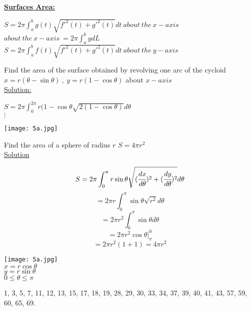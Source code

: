 \noindent{\color{smalt(darkpowderblue)}\rule{\linewidth}{.2mm}}
\textbf{\color{smalt(darkpowderblue)}\large \underline{Surfaces Area:}}
\begin{center}
    $S=2\pi\int_a^b g(t)\sqrt{f'^2(t)+g'^2(t)}dt~about~the~x-axis$\\
$about~the~x-axis~=2\pi\int_a^b ydL$\\
$S=2\pi\int_a^b f(t)\sqrt{f'^2(t)+g'^2(t)}dt~about~the~y-axis$
\end{center}
\begin{example}
Find the area of the surface obtained by revolving one arc of the cycloid $x=r(\theta-\sin\theta)~,~y=r(1-\cos\theta)$ about $x-axis$\\
\underline{\color{smalt(darkpowderblue)}Solution:}\\
\begin{minipage}{0.6\textwidth}
\begin{center}
$S=2\pi\int_0^{2\pi}r(1-\cos\theta\sqrt{2(1-\cos\theta)}d\theta$\\
$\vdots$    
\end{center}
\end{minipage}
\begin{minipage}{0.6\textwidth}
\texttt{[image: 5a.jpg]}
\end{minipage}
\end{example}

\begin{example}
Find the area of a sphere of radius $r$ $\boxed{S=4\pi r^2}$\\
\underline{\color{smalt(darkpowderblue)}Solution} \\
\begin{minipage}{0.6\textwidth}
$$S=2\pi\int_0^\pi r\sin\theta\sqrt{(\cfrac{dx}{d\theta})^2+(\cfrac{dy}{d\theta})^2}d\theta$$
$$=2\pi r\int_0^\pi\sin\theta\sqrt{r^2}d\theta$$
$$=2\pi r^2\int_0^\pi\sin\theta d\theta$$
$$=2\pi r^2\cos\theta|_\pi^0$$
$$=2\pi r^2(1+1)=4\pi r^2$$
\end{minipage}
\begin{minipage}{0.6\textwidth}
\texttt{[image: 5a.jpg]}\\
$x=r\cos\theta$\\
$y=r\sin\theta$\\
$0\leq\theta\leq\pi$
\end{minipage}
\end{example}
\noindent{\color{smalt(darkpowderblue)}\rule{\linewidth}{.2mm}}
\begin{problem}
 1, 3, 5, 7, 11, 12, 13, 15, 17, 18, 19, 28, 29, 30, 33, 34, 37, 39, 40, 41, 43, 57, 59, 60, 65, 69.
\end{problem}
